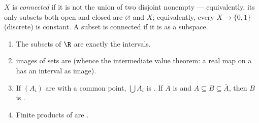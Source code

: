 \begin{definition}\label{def:b3:topology:connected}
$X$ is \emph{connected} if it is not the
union of two disjoint nonempty  --- equivalently, its
only subsets both open and closed are $\varnothing$ and $X$;
equivalently, every  $X \to \{0, 1\}$ (discrete)
is constant. A subset is connected if it is as a subspace.
\end{definition}

\begin{theorem}\label{thm:b3:topology:connectedbasics}
\begin{enumerate}
  \item The  subsets of $\R$ are exactly the intervals.
  \item {} images of  sets are  (whence
        the intermediate value theorem: a  real map on
        a  has an interval as image).
  \item If $(A_i)$ are  with a common point, $\bigcup
        A_i$ is . If $A$ is  and $A \subseteq
        B \subseteq \bar A$, then $B$ is .
  \item Finite products of  are .
\end{enumerate}
\end{theorem}

